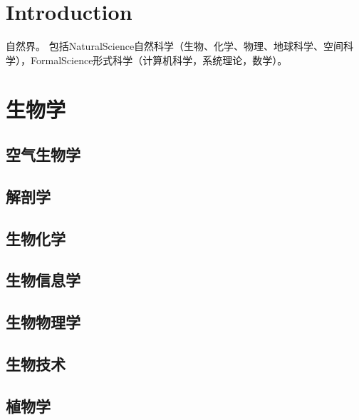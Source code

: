 

\chapter{Introduction}

自然界。
包括NaturalScience自然科学（生物、化学、物理、地球科学、空间科学），FormalScience形式科学（计算机科学，系统理论，数学）。




\chapter{生物学}


\section{空气生物学}
\section{解剖学}
\section{生物化学}
\section{生物信息学}
\section{生物物理学}
\section{生物技术}
\section{植物学}
